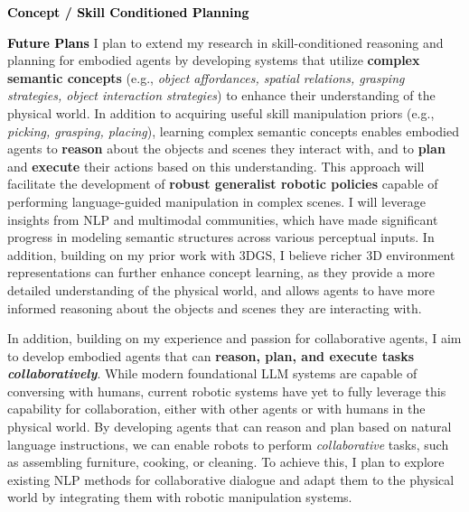 \documentclass[11pt]{article}
\newcommand{\statement}[1]{\medskip\noindent
  \textcolor{black}{\textbf{#1}}\space
}
\newif\ifcomments
\newcommand{\todo}[1]{\ifcomments\textcolor{red}{TODO: #1}\fi}
\begin{document}
\statement{Concept / Skill Conditioned Planning} \todo{Talk about the current project}

\statement{Future Plans} I plan to extend my research in skill-conditioned reasoning and planning for embodied agents by developing systems that utilize \textbf{complex semantic concepts} (e.g., \textit{object affordances, spatial relations, grasping strategies, object interaction strategies}) to enhance their understanding of the physical world. In addition to acquiring useful skill manipulation priors (e.g., \textit{picking, grasping, placing}), learning complex semantic concepts enables embodied agents to \textbf{reason} about the objects and scenes they interact with, and to \textbf{plan} and \textbf{execute} their actions based on this understanding. This approach will facilitate the development of \textbf{robust generalist robotic policies} capable of performing language-guided manipulation in complex scenes. I will leverage insights from NLP and multimodal communities, which have made significant progress in modeling semantic structures across various perceptual inputs. In addition, building on my prior work with 3DGS, I believe richer 3D environment representations can further enhance concept learning, as they provide a more detailed understanding of the physical world, and allows agents to have more informed reasoning about the objects and scenes they are interacting with.

In addition, building on my experience and passion for collaborative agents, I aim to develop embodied agents that can \textbf{reason, plan, and execute tasks \textit{collaboratively}}. While modern foundational LLM systems are capable of conversing with humans, current robotic systems have yet to fully leverage this capability for collaboration, either with other agents or with humans in the physical world. By developing agents that can reason and plan based on natural language instructions, we can enable robots to perform \textit{collaborative} tasks, such as assembling furniture, cooking, or cleaning. To achieve this, I plan to explore existing NLP methods for collaborative dialogue and adapt them to the physical world by integrating them with robotic manipulation systems.


\end{document}

